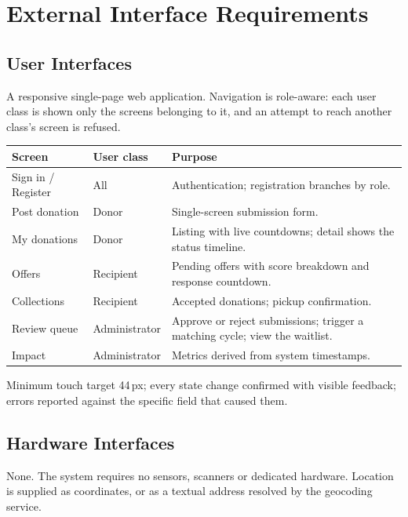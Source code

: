 \documentclass[11pt,a4paper]{article}
\begin{document}
\section{External Interface Requirements}

\subsection{User Interfaces}
A responsive single-page web application. Navigation is role-aware: each user
class is shown only the screens belonging to it, and an attempt to reach another
class's screen is refused.

\begin{longtable}{@{}p{3.3cm}p{3.0cm}p{8.2cm}@{}}
\toprule
\textbf{Screen} & \textbf{User class} & \textbf{Purpose} \\
\midrule
\endhead
Sign in / Register & All & Authentication; registration branches by role. \\
Post donation & Donor & Single-screen submission form. \\
My donations & Donor & Listing with live countdowns; detail shows the status timeline. \\
Offers & Recipient & Pending offers with score breakdown and response countdown. \\
Collections & Recipient & Accepted donations; pickup confirmation. \\
Review queue & Administrator & Approve or reject submissions; trigger a matching cycle; view the waitlist. \\
Impact & Administrator & Metrics derived from system timestamps. \\
\bottomrule
\end{longtable}

\noindent
Minimum touch target 44\,px; every state change confirmed with visible feedback;
errors reported against the specific field that caused them.

\subsection{Hardware Interfaces}
None. The system requires no sensors, scanners or dedicated hardware. Location
is supplied as coordinates, or as a textual address resolved by the geocoding
service.
\end{document}
